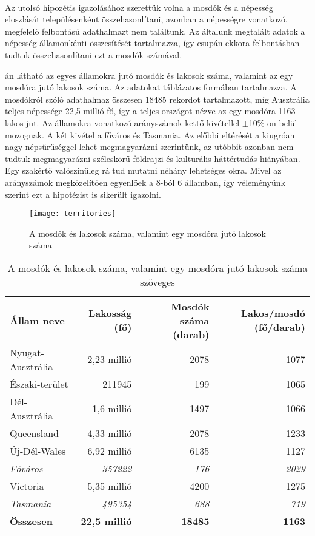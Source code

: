 	\paragraph{}
	Az utolsó hipozétis igazolásához szerettük volna a mosdók és a népesség eloszlását településenként összehasonlítani, azonban a népességre vonatkozó, megfelelő felbontású adathalmazt nem találtunk. Az általunk megtalált adatok a népesség államonkénti összesítését tartalmazza, így csupán ekkora felbontásban tudtuk összehasonlítani ezt a mosdók számával.\par
	án látható az egyes államokra jutó mosdók és lakosok száma, valamint az egy mosdóra jutó lakosok száma. Az adatokat táblázatos formában  tartalmazza. A mosdókról szóló adathalmaz összesen 18485 rekordot tartalmazott, míg Ausztrália teljes népessége 22,5 millió fő, így a teljes országot nézve az egy mosdóra 1163 lakos jut. Az államokra vonatkozó arányszámok kettő kivétellel $\pm$10\%-on belül mozognak. A két kivétel a főváros és Tasmania. Az előbbi eltérését a kiugróan nagy népsűrűséggel lehet megmagyarázni szerintünk, az utóbbit azonban nem tudtuk megmagyarázni széleskörű földrajzi és kulturális háttértudás hiányában. Egy szakértő valószínűleg rá tud mutatni néhány lehetséges okra. Mivel az arányszámok megközelítően egyenlőek a 8-ból 6 államban, így véleményünk szerint ezt a hipotézist is sikerült igazolni. 
		\begin{figure}[h]
			\centering	
			\texttt{[image: territories]}
			\caption{A mosdók és lakosok száma, valamint egy mosdóra jutó lakosok száma}
			\label{fig:territories}
		\end{figure}
		\begin{table}[h]
		\centering
		\begin{tabular}{ | l | r | r | r | }
			\hline
			\textbf{Állam neve} & \textbf{Lakosság (fő)} & \textbf{Mosdók száma (darab)} & \textbf{Lakos/mosdó (fő/darab)} \\ \hline
			Nyugat-Ausztrália & 2,23 millió & 2078 & 1077\\ \hline
			Északi-terület & 211945 & 199 & 1065\\ \hline
			Dél-Ausztrália & 1,6 millió & 1497 & 1066\\ \hline
			Queensland & 4,33 millió & 2078 & 1233\\ \hline
			Új-Dél-Wales & 6,92 millió & 6135 & 1127\\ \hline
			\textit{Főváros} & \textit{357222} & \textit{176} & \textit{2029}\\ \hline
			Victoria & 5,35 millió & 4200 & 1275\\ \hline
			\textit{Tasmania} & \textit{495354} & \textit{688} & \textit{719} \\ \hhline{|=|=|=|=|}
			\textbf{Összesen} & \textbf{22,5 millió} & \textbf{18485} & \textbf{1163} \\ \hline
		\end{tabular}
		\caption{A mosdók és lakosok száma, valamint egy mosdóra jutó lakosok száma szöveges}
		\label{tab:territoires}
		
	\end{table}\par
	
